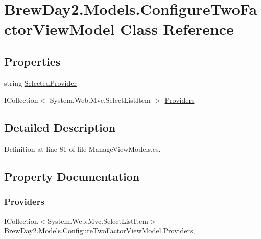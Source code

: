 \hypertarget{class_brew_day2_1_1_models_1_1_configure_two_factor_view_model}{}\section{Brew\+Day2.\+Models.\+Configure\+Two\+Factor\+View\+Model Class Reference}
\label{class_brew_day2_1_1_models_1_1_configure_two_factor_view_model}
\subsection*{Properties}
\begin{DoxyCompactItemize}
\item 
string \mbox{\hyperlink{class_brew_day2_1_1_models_1_1_configure_two_factor_view_model_a31e8b62f8906ff16b28c3a29e2c23045}{Selected\+Provider}}
\item 
I\+Collection$<$ System.\+Web.\+Mvc.\+Select\+List\+Item $>$ \mbox{\hyperlink{class_brew_day2_1_1_models_1_1_configure_two_factor_view_model_add783ea26242bf8a73d9fbbc72fbbaf7}{Providers}}
\end{DoxyCompactItemize}


\subsection{Detailed Description}


Definition at line 81 of file Manage\+View\+Models.\+cs.



\subsection{Property Documentation}
\mbox{\label{class_brew_day2_1_1_models_1_1_configure_two_factor_view_model_add783ea26242bf8a73d9fbbc72fbbaf7}} 
\subsubsection{\texorpdfstring{Providers}{Providers}}
{\footnotesize\ttfamily I\+Collection$<$System.\+Web.\+Mvc.\+Select\+List\+Item$>$ Brew\+Day2.\+Models.\+Configure\+Two\+Factor\+View\+Model.\+Providers\hspace{0.3cm}{\ttfamily [get]}, {\ttfamily [set]}}



